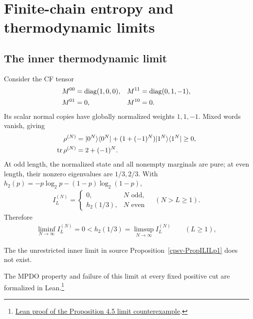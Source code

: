 \documentclass[aps,pra,reprint,nofootinbib,onecolumn]{revtex4-2}
\begin{document}
\section{Finite-chain entropy and thermodynamic limits}\label{sec:entropy}

\subsection{The inner thermodynamic limit}

Consider the CF tensor
\begin{align}
	M^{00} & =\operatorname{diag}(1,0,0),           &
	M^{11} & =\operatorname{diag}(0,1,-1),\nonumber                \\
	M^{01} & =0,                      & M^{10} & =0.
	\label{eq:parity-M}
\end{align}
Its scalar normal copies have globally normalized weights $1,1,-1$.
Mixed words vanish, giving
\begin{align}
	\rho^{(N)}
	              & =\lvert0^N\rangle\langle0^N\rvert+(1+(-1)^N)\lvert1^N\rangle\langle1^N\rvert\geq0,\nonumber \\
	\operatorname{tr}\rho^{(N)} & =2+(-1)^N.
	\label{eq:rho-parity}
\end{align}
At odd length, the normalized state and all nonempty marginals
are pure; at even length, their nonzero eigenvalues are $1/3,2/3$.
With $h_2(p)=-p\log_2p-(1-p)\log_2(1-p)$,
\begin{align}
	I_L^{(N)}
	=\begin{cases}
		 0,        & N\text{ odd}, \\
		 h_2(1/3), & N\text{ even}
	 \end{cases}
	\quad(N>L\geq1).
	\label{eq:IL-parity}
\end{align}
Therefore
\begin{align}
	\liminf_{N\to\infty}I_L^{(N)}=0
	<h_2(1/3)=\limsup_{N\to\infty}I_L^{(N)}
	\qquad(L\geq1),
	\label{eq:oscillation-limit}
\end{align}
\begin{refutation}
	The the unrestricted inner limit in source
	Proposition~\ref{cpsv-PropILILp1} does not exist.
\end{refutation}
The MPDO property and failure of this limit at every fixed positive cut
are formalized in Lean.\footnote{\href{https://github.com/LionSR/TNLean/blob/f45bfbbccf671395e4f6018845f81b8aaaad4cb1/TNLean/MPS/MPDO/ThermodynamicLimitCounterexample.lean\#L679}{Lean proof of the Proposition 4.5 limit counterexample}.}
\end{document}
